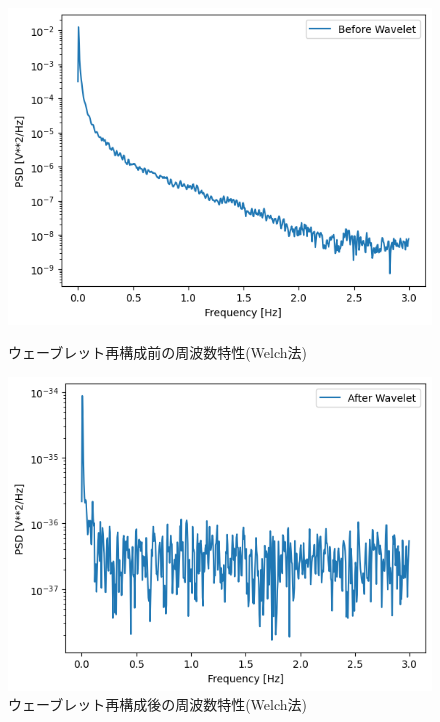 \documentclass[dvipdfmx]{jsarticle}
\begin{document}
\begin{figure}[htbp]
    \begin{minipage}[c]{0.5\hsize}
      \centering
      \includegraphics[width=\linewidth]{./img/before_wavelet_freq.png}
      \caption{ウェーブレット再構成前の周波数特性(Welch法)}
    \end{minipage}
    \begin{minipage}[c]{0.5\hsize}
      \centering
      \includegraphics[width=\linewidth]{./img/after_wavelet_freq.png}
      \caption{ウェーブレット再構成後の周波数特性(Welch法)}
    \end{minipage}
\end{figure}
\end{document}
